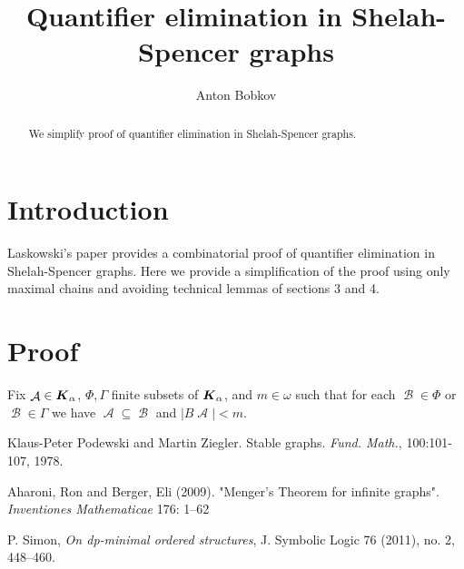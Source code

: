 \documentclass{amsart}
\DeclareMathOperator{\A}{\mathcal A}
\DeclareMathOperator{\B}{\mathcal B}
\DeclareMathOperator{\K}{\boldface K_\alpha}
\begin{document}
\title{Quantifier elimination in Shelah-Spencer graphs}
\author{Anton Bobkov}

\begin{abstract}
	We simplify \cite{Laskowski} proof of quantifier elimination in Shelah-Spencer graphs.
\end{abstract}

\maketitle

\section{Introduction}

Laskowski's paper \cite{Laskowski} provides a combinatorial proof of quantifier elimination in Shelah-Spencer graphs. Here we provide a simplification of the proof using only maximal chains and avoiding technical lemmas of sections 3 and 4.

\section{Proof}

\begin{Definition}
	Fix $\A \in \K$, $\Phi, \Gamma$ finite subsets of $\K$, and $m \in \omega$ such that for each $\B \in \Phi$ or $\B \in \Gamma$ we have $\A \subseteq \B$ and $|B\A| < m$.
\end{Definition}

\begin{thebibliography}{9}

	Klaus-Peter Podewski and Martin Ziegler. Stable graphs. \textit{Fund. Math.}, 100:101-107, 1978.

	Aharoni, Ron and Berger, Eli (2009). "Menger's Theorem for infinite graphs". \textit{Inventiones Mathematicae} 176: 1–62
	
	P. Simon, \textit{On dp-minimal ordered structures}, J. Symbolic Logic 76 (2011), no. 2, 448–460.


\end{thebibliography}
\end{document}
